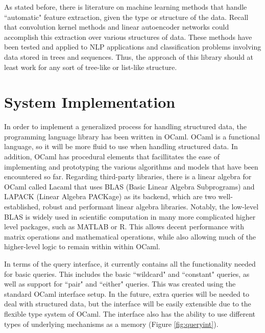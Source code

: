 \documentclass{sig-alternate}
\begin{document}
As stated before, there is literature on machine learning methods that handle ``automatic" feature 
extraction, given the type or structure of the data. Recall that convolution kernel methods and 
linear autoencoder networks could accomplish this extraction over various structures of data. These 
methods have been tested and applied to NLP applications and classification problems involving data 
stored in trees and sequences.  Thus, the approach of this library should at least work for any sort 
of tree-like or list-like structure.

\section{System Implementation}
\label{sec:sysimp}

In order to implement a generalized process for handling structured data, the programming language 
library has been written in OCaml. OCaml is a functional language, so it will be more fluid to use 
when handling structured data. In addition, OCaml has procedural elements that facillitates the ease 
of implementing and prototyping the various algorithms and models that have been encountered so far. 
Regarding third-party libraries, there is a linear algebra for OCaml called Lacaml that uses BLAS 
(Basic Linear Algebra Subprograms)
and LAPACK (Linear Algebra PACKage)
as its backend, which are two well-established, robust and performant linear algebra 
libraries. Notably, the low-level BLAS is widely used in scientific computation in many more complicated
higher level packages, such as MATLAB or R. This allows decent performance with matrix operations
and mathematical operations, while also allowing
much of the higher-level logic to remain within within OCaml.

In terms of the query interface, it currently contains all the functionality needed for basic 
queries.  This includes the basic ``wildcard" and ``constant" queries, as well as support for 
``pair" and ``either" queries. This was created using the standard OCaml interface setup. In the 
future, extra queries will be needed to deal with structured data, but the interface will be easily 
extensible due to the flexible type system of OCaml. The interface also has the ability to use 
different types of underlying mechanisms as a memory (Figure \ref{fig:queryint}).
\end{document}
